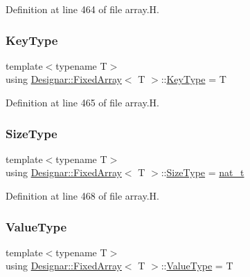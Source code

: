 Definition at line 464 of file array.\+H.

\mbox{\label{class_designar_1_1_fixed_array_a3a725cf21783340b8aca29dd1db0acf0}} 
\subsubsection{\texorpdfstring{Key\+Type}{KeyType}}
{\footnotesize\ttfamily template$<$typename T$>$ \\
using \hyperlink{class_designar_1_1_fixed_array}{Designar\+::\+Fixed\+Array}$<$ T $>$\+::\hyperlink{class_designar_1_1_fixed_array_a3a725cf21783340b8aca29dd1db0acf0}{Key\+Type} =  T}



Definition at line 465 of file array.\+H.

\mbox{\label{class_designar_1_1_fixed_array_a503ae414cc313d248e77c08e62ef043c}} 
\subsubsection{\texorpdfstring{Size\+Type}{SizeType}}
{\footnotesize\ttfamily template$<$typename T$>$ \\
using \hyperlink{class_designar_1_1_fixed_array}{Designar\+::\+Fixed\+Array}$<$ T $>$\+::\hyperlink{class_designar_1_1_fixed_array_a503ae414cc313d248e77c08e62ef043c}{Size\+Type} =  \hyperlink{namespace_designar_aa72662848b9f4815e7bf31a7cf3e33d1}{nat\+\_\+t}}



Definition at line 468 of file array.\+H.

\mbox{\label{class_designar_1_1_fixed_array_ac1cfeb4403a2dcbffd7ef494e5b873d0}} 
\subsubsection{\texorpdfstring{Value\+Type}{ValueType}}
{\footnotesize\ttfamily template$<$typename T$>$ \\
using \hyperlink{class_designar_1_1_fixed_array}{Designar\+::\+Fixed\+Array}$<$ T $>$\+::\hyperlink{class_designar_1_1_fixed_array_ac1cfeb4403a2dcbffd7ef494e5b873d0}{Value\+Type} =  T}



